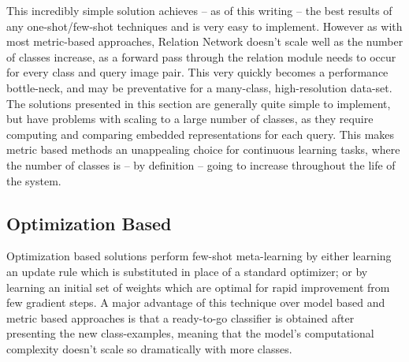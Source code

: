 \documentclass{report}
\begin{document}
	This incredibly simple solution achieves -- as of this writing -- the best results of any one-shot/few-shot techniques and is very easy to implement. However as with most metric-based approaches, Relation Network doesn't scale well as the number of classes increase, as a forward pass through the relation module needs to occur for every class and query image pair. This very quickly becomes a performance bottle-neck, and may be preventative for a many-class, high-resolution data-set. \newline \newline
	The solutions presented in this section are generally quite simple to implement, but have problems with scaling to a large number of classes, as they require computing and comparing embedded representations for each query. This makes metric based methods an unappealing choice for continuous learning tasks, where the number of classes is -- by definition -- going to increase throughout the life of the system. \par

	\subsection{Optimization Based} \label{related-meta-opt:1}
	Optimization based solutions perform few-shot meta-learning by either learning an update rule which is substituted in place of a standard optimizer; or by learning an initial set of weights which are optimal for rapid improvement from few gradient steps. A major advantage of this technique over model based and metric based approaches is that a ready-to-go classifier is obtained after presenting the new class-examples, meaning that the model's computational complexity doesn't scale so dramatically with more classes. \par
	
\end{document}
